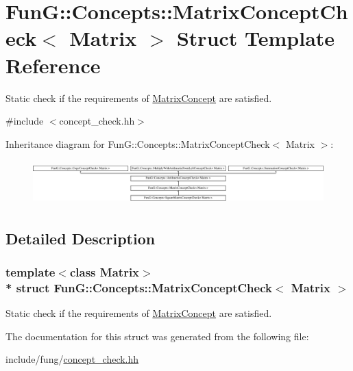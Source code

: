 \hypertarget{structFunG_1_1Concepts_1_1MatrixConceptCheck}{}\section{FunG\+:\+:Concepts\+:\+:Matrix\+Concept\+Check$<$ Matrix $>$ Struct Template Reference}
\label{structFunG_1_1Concepts_1_1MatrixConceptCheck}


Static check if the requirements of \hyperlink{structFunG_1_1Concepts_1_1MatrixConcept}{Matrix\+Concept} are satisfied.  




{\ttfamily \#include $<$concept\+\_\+check.\+hh$>$}

Inheritance diagram for FunG\+:\+:Concepts\+:\+:Matrix\+Concept\+Check$<$ Matrix $>$\+:\begin{figure}[H]
\begin{center}
\leavevmode
\includegraphics[height=1.728395cm]{structFunG_1_1Concepts_1_1MatrixConceptCheck}
\end{center}
\end{figure}


\subsection{Detailed Description}
\subsubsection*{template$<$class Matrix$>$\\*
struct Fun\+G\+::\+Concepts\+::\+Matrix\+Concept\+Check$<$ Matrix $>$}

Static check if the requirements of \hyperlink{structFunG_1_1Concepts_1_1MatrixConcept}{Matrix\+Concept} are satisfied. 

The documentation for this struct was generated from the following file\+:\begin{DoxyCompactItemize}
\item 
include/fung/\hyperlink{concept__check_8hh}{concept\+\_\+check.\+hh}\end{DoxyCompactItemize}
